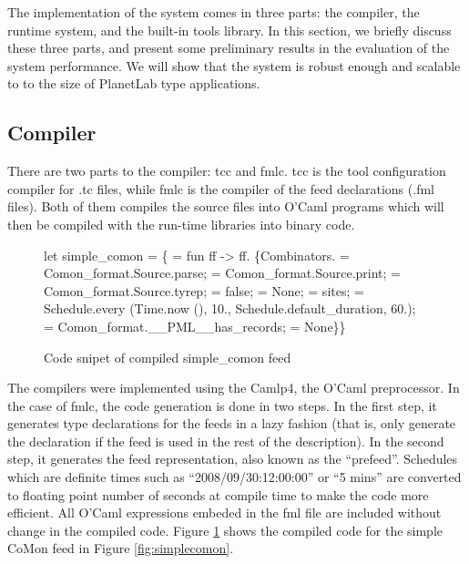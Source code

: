 The implementation of the \padsd{} system comes in
three parts: the compiler, the runtime system, and the
built-in tools library. In this section, we briefly
discuss these three parts, and present some preliminary
results in the evaluation of the system performance. 
We will show that the system is robust enough and scalable to
to the size of PlanetLab type applications. 

\subsection{Compiler}
There are two parts to the \padsd{} compiler: tcc and fmlc.
tcc is the tool configuration compiler for .tc files, while fmlc is the
compiler of the feed declarations (.fml files). Both of them
compiles the source files into O'Caml programs which will
then be compiled with the run-time libraries into 
binary code. 

\begin{figure}[th]
\centering
\begin{codebox}
let simple_comon =
\{ = fun ff ->
 ff.
 \{Combinators. = Comon_format.Source.parse;
   = Comon_format.Source.print;
   = Comon_format.Source.tyrep; 
   = false;
   = None; 
   = sites;
   =
    Schedule.{\kw every} (Time.now (), 10., 
                    Schedule.default_duration, 60.);
   = Comon_format.__PML__has_records; 
   = None\}\}
\end{codebox}
\caption{Code snipet of compiled simple\_comon feed}\label{fig:compiledcomon}
\end{figure}

The compilers were implemented using the Camlp4, the O'Caml
preprocessor. 
In the case of fmlc, the code generation is done in two steps.
In the first step, it generates type declarations for the feeds in a
lazy fashion (that is, only generate the declaration if the
feed is used in the rest of the description).
In the second step, it generates the feed representation,
also known as the ``prefeed''. Schedules which are
definite times such as ``2008/09/30:12:00:00'' or ``5 mins'' are
converted to floating point number of seconds at compile time
to make the code more efficient.
All O'Caml expressions embeded in the fml file are
included without change in the compiled code. 
Figure \ref{fig:compiledcomon} shows the compiled code for
the simple CoMon feed in Figure \ref{fig:simplecomon}.

